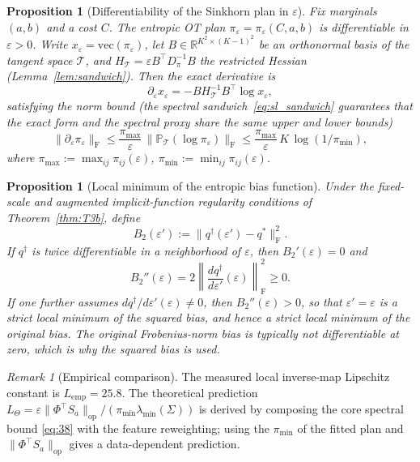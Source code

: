 \documentclass[11pt,a4paper]{article}
\newtheorem{proposition}[theorem]{Proposition}
\theoremstyle{remark}
\newtheorem{remark}[theorem]{Remark}
\begin{document}
\begin{proposition}[Differentiability of the Sinkhorn plan in $\varepsilon$]\label{prop:eps_diff}
Fix marginals $(a,b)$ and a cost $C$. The entropic OT plan
$\pi_\varepsilon=\pi_\varepsilon(C,a,b)$ is differentiable in $\varepsilon>0$. Write
$x_\varepsilon=\mathrm{vec}(\pi_\varepsilon)$, let
$B\in\mathbb{R}^{K^2\times(K-1)^2}$ be an orthonormal basis of the tangent space
$\mathcal{T}$, and $H_{\mathcal{T}}=\varepsilon B^{\top}D_\pi^{-1}B$ the restricted Hessian
(Lemma~\ref{lem:sandwich}). Then the exact derivative is
\[
\partial_\varepsilon x_\varepsilon=-B H_{\mathcal{T}}^{-1}B^{\top}\log x_\varepsilon,
\]
satisfying the norm bound (the spectral sandwich~\eqref{eq:sl_sandwich} guarantees that the
exact form and the spectral proxy share the same upper and lower bounds)
\[
\|\partial_\varepsilon\pi_\varepsilon\|_{\mathrm{F}}\le\frac{\pi_{\max}}{\varepsilon}\,\|\mathbb{P}_{\mathcal{T}}(\log\pi_\varepsilon)\|_{\mathrm{F}}\le\frac{\pi_{\max}}{\varepsilon}\,K\,\log(1/\pi_{\min}),
\]
where $\pi_{\max}:=\max_{ij}\pi_{ij}(\varepsilon)$,
$\pi_{\min}:=\min_{ij}\pi_{ij}(\varepsilon)$.
\end{proposition}

\begin{proposition}[Local minimum of the entropic bias function]\label{prop:bias_convex}
Under the fixed-scale and augmented implicit-function regularity conditions of
Theorem~\ref{thm:T3b}, define
\[
B_2(\varepsilon'):=\|q^{\dagger}(\varepsilon')-q^*\|_{\mathrm F}^{2}.
\]
If $q^{\dagger}$ is twice differentiable in a neighborhood of $\varepsilon$, then
$B_2'(\varepsilon)=0$ and
\[
B_2''(\varepsilon)=2\left\|\frac{dq^{\dagger}}{d\varepsilon'}(\varepsilon)\right\|_{\mathrm F}^{2}\ge0.
\]
If one further assumes $dq^{\dagger}/d\varepsilon'(\varepsilon)\ne0$, then
$B_2''(\varepsilon)>0$, so that $\varepsilon'=\varepsilon$ is a strict local minimum of the
squared bias, and hence a strict local minimum of the original bias. The original
Frobenius-norm bias is typically not differentiable at zero, which is why the squared bias
is used.
\end{proposition}

\begin{remark}[Empirical comparison]
The measured local inverse-map Lipschitz constant is $L_{\mathrm{emp}}=25.8$. The
theoretical prediction
$L_\Theta=\varepsilon\|\Phi^{\top}S_a\|_{\mathrm{op}}/(\pi_{\min}\lambda_{\min}(\Sigma))$
is derived by composing the core spectral bound \eqref{eq:38} with the feature reweighting;
using the $\pi_{\min}$ of the fitted plan and $\|\Phi^{\top}S_a\|_{\mathrm{op}}$ gives a
data-dependent prediction.
\end{remark}
\end{document}
